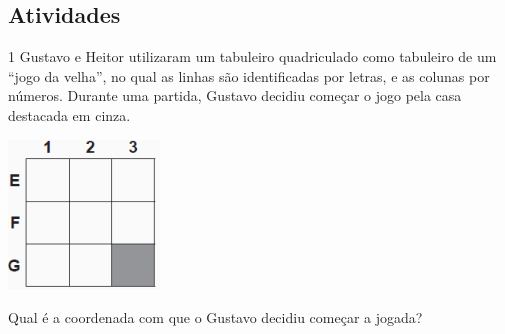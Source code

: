 \begin{escolha}
\begin{boxmedio}
\begin{boxmedio}
{\begin{boxpeq}
\begin{boxpeq}
{\begin{boxpeq}
\begin{boxmedio}
\begin{boxmedio}
\begin{boxpeq}
\begin{boxmedio}
\begin{boxpeq}
\begin{boxpeq}
\begin{boxpeq}
\begin{boxpeq}
\begin{boxmedio}
{\begin{boxmedio}
\begin{boxmedio}
\begin{boxpeq}
\begin{boxmedio}
\begin{boxpeq}
\begin{boxpeq}
\begin{boxpeq}
\begin{escolha}
{\begin{boxmedio}
\begin{boxpeq}
\begin{boxpeq}
\begin{boxpeq}
\begin{boxpeq}
\begin{boxpeq}
\begin{boxmedio}
\begin{boxpeq}
\begin{boxpeq}
\begin{boxpeq}
{\begin{boxpeq}
\begin{boxmedio}
\begin{boxpeq}
\begin{boxpeq}
\begin{boxpeq}
{\begin{boxpeq}
\begin{boxmedio}
{\begin{boxpeq}
\begin{boxpeq}
\begin{boxmedio}
\begin{boxmedio}
\begin{boxpeq}
\begin{boxpeq}
{\begin{boxpeq}
\begin{boxpeq}
\begin{boxpeq}
\begin{boxpeq}
\begin{boxpeq}
\begin{escolha}
\begin{escolha}
{\begin{boxmedio}
\begin{boxpeq}
\begin{q°}
\begin{boxmedio}
\begin{boxpeq}
\begin{boxpeq}
\begin{boxmedio}
\begin{boxmedio}
\begin{boxmedio}
\section{Atividades}

\num{1} Gustavo e Heitor utilizaram um tabuleiro quadriculado como tabuleiro
de um ``jogo da velha'', no qual as linhas são identificadas por letras,
e as colunas por números. Durante uma partida, Gustavo decidiu começar
o jogo pela casa destacada em cinza.

\includegraphics[width=1.5918in,height=1.55847in]{./_SAEB_9_MAT/media/image197.png}


Qual é a coordenada com que o Gustavo decidiu começar a jogada?



\end{boxmedio}
\end{boxmedio}
\end{boxmedio}
\end{boxpeq}
\end{boxpeq}
\end{boxmedio}
\end{q°}
\end{boxpeq}
\end{boxmedio}}
\end{escolha}
\end{escolha}
\end{boxpeq}
\end{boxpeq}
\end{boxpeq}
\end{boxpeq}
\end{boxpeq}}
\end{boxpeq}
\end{boxpeq}
\end{boxmedio}
\end{boxmedio}
\end{boxpeq}
\end{boxpeq}}
\end{boxmedio}
\end{boxpeq}}
\end{boxpeq}
\end{boxpeq}
\end{boxpeq}
\end{boxmedio}
\end{boxpeq}}
\end{boxpeq}
\end{boxpeq}
\end{boxpeq}
\end{boxmedio}
\end{boxpeq}
\end{boxpeq}
\end{boxpeq}
\end{boxpeq}
\end{boxpeq}
\end{boxmedio}}
\end{escolha}
\end{boxpeq}
\end{boxpeq}
\end{boxpeq}
\end{boxmedio}
\end{boxpeq}
\end{boxmedio}
\end{boxmedio}}
\end{boxmedio}
\end{boxpeq}
\end{boxpeq}
\end{boxpeq}
\end{boxpeq}
\end{boxmedio}
\end{boxpeq}
\end{boxmedio}
\end{boxmedio}
\end{boxpeq}}
\end{boxpeq}
\end{boxpeq}}
\end{boxmedio}
\end{boxmedio}
\end{escolha}
